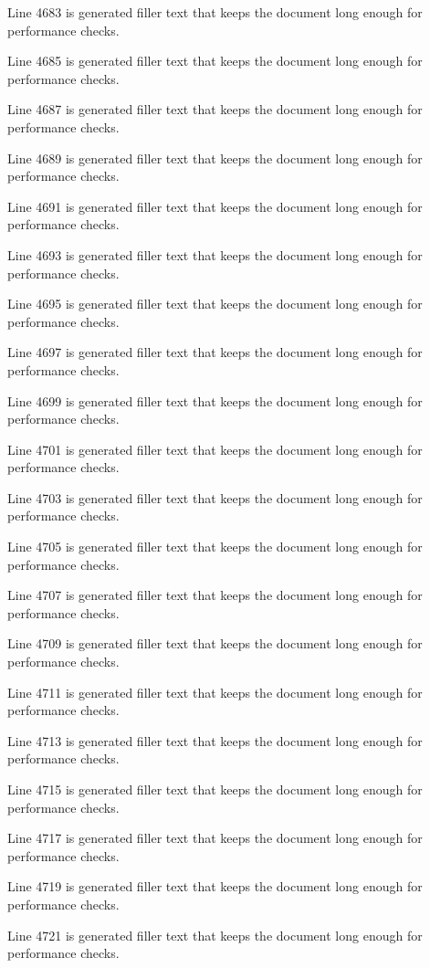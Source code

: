 Line 4683 is generated filler text that keeps the document long enough for performance checks.

Line 4685 is generated filler text that keeps the document long enough for performance checks.

Line 4687 is generated filler text that keeps the document long enough for performance checks.

Line 4689 is generated filler text that keeps the document long enough for performance checks.

Line 4691 is generated filler text that keeps the document long enough for performance checks.

Line 4693 is generated filler text that keeps the document long enough for performance checks.

Line 4695 is generated filler text that keeps the document long enough for performance checks.

Line 4697 is generated filler text that keeps the document long enough for performance checks.

Line 4699 is generated filler text that keeps the document long enough for performance checks.

Line 4701 is generated filler text that keeps the document long enough for performance checks.

Line 4703 is generated filler text that keeps the document long enough for performance checks.

Line 4705 is generated filler text that keeps the document long enough for performance checks.

Line 4707 is generated filler text that keeps the document long enough for performance checks.

Line 4709 is generated filler text that keeps the document long enough for performance checks.

Line 4711 is generated filler text that keeps the document long enough for performance checks.

Line 4713 is generated filler text that keeps the document long enough for performance checks.

Line 4715 is generated filler text that keeps the document long enough for performance checks.

Line 4717 is generated filler text that keeps the document long enough for performance checks.

Line 4719 is generated filler text that keeps the document long enough for performance checks.

Line 4721 is generated filler text that keeps the document long enough for performance checks.


